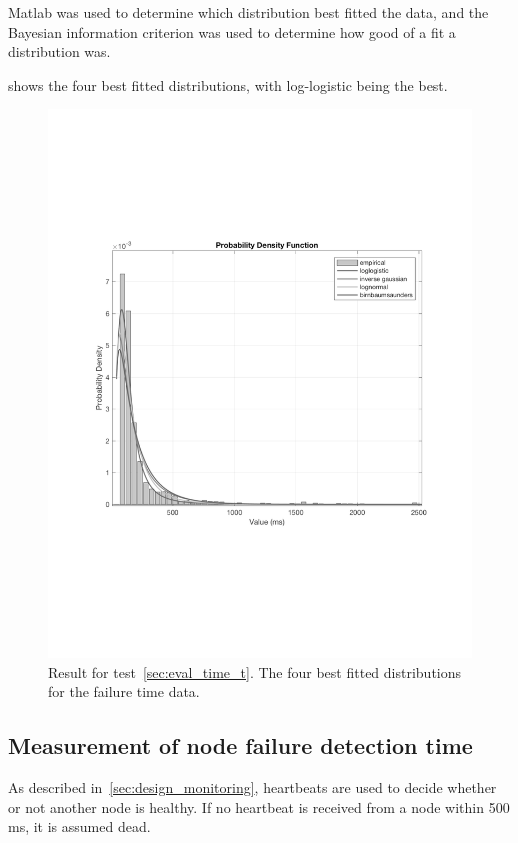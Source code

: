 \documentclass{cslthse-msc}
\begin{document}
Matlab was used to determine which distribution best fitted the data, and the Bayesian information criterion was used to determine how good of a fit a distribution was.

 shows the four best fitted distributions, with log-logistic being the best.


\begin{figure}[!hbt]
\centering
\includegraphics[scale=0.5]{images/results/distribution_results.pdf} 
\caption{Result for test~\ref{sec:eval_time_t}. The four best fitted distributions for the failure time data.}\label{fig:distribution_results}
\end{figure} 

\subsection{Measurement of node failure detection time} \label{subsec:eval_node_fail_time}
As described in~\cref{sec:design_monitoring}, heartbeats are used to decide whether or not another node is healthy. If no heartbeat is received from a node within 500 ms, it is assumed dead. 
\end{document}
